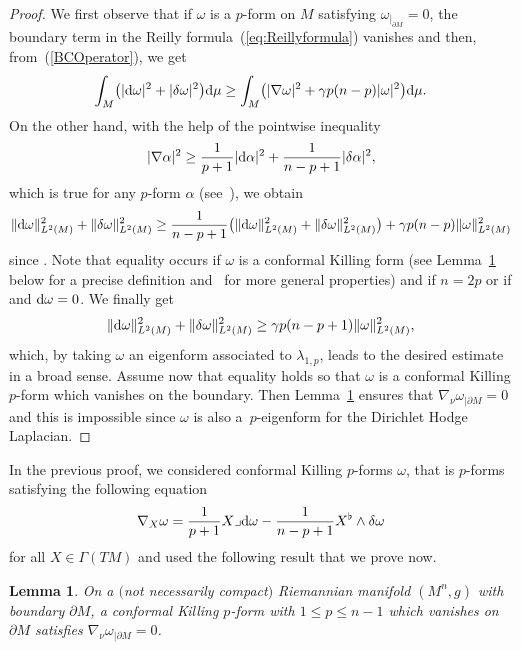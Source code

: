 \documentclass[pdftex]{sigma}
\numberwithin{equation}{section}
\newtheorem{Lemma}[Theorem]{Lemma}
\theoremstyle{definition}
\begin{document}
\begin{proof} We first observe that if $\omega$ is a $p$-form on $M$ satisfying $\omega_{|_{\partial M}}=0$, the boundary term in the Reilly formula~(\ref{eq:Reillyformula}) vanishes and then, from~(\ref{BCOperator}), we get
\[
\int_M\bigl(|{\rm d}\omega|^2+|\delta\omega|^2\bigr){\rm d}\mu\geq\int_M\bigl(|\nabla\omega|^2+\gamma p(n-p)|\omega|^2\bigr){\rm d}\mu.
\]
On the other hand, with the help of the pointwise inequality
\[
|\nabla\alpha|^2\geq\frac{1}{p+1}|{\rm d}\alpha|^2+\frac{1}{n-p+1}|\delta\alpha|^2,
\]
which is true for any $p$-form $\alpha$ (see~\cite[Lemme 6.8]{GM}), we obtain
\[
\|{\rm d}\omega \|^2_{L^2(M)}+\|\delta \omega \|^2_{L^2(M)}\ge \frac{1}{n-p+1}\bigl(\|{\rm d}\omega \|^2_{L^2(M)}+\|\delta \omega \|^2_{L^2(M)}\bigr)+\gamma p(n-p)\|\omega \|^2_{L^2(M)}
\]
since . Note that equality occurs if $\omega$ is a conformal Killing form (see Lemma~\ref{CKFB} below for a precise definition and~\cite{Semmelmann02} for more general properties) and if $n=2p$ or if  and ${\rm d}\omega=0$. We finally get
\begin{equation}\label{LaplaceBounds}
\|{\rm d}\omega\|^2_{L^2(M)}+\|\delta\omega \|^2_{L^2(M)} \geq \gamma p(n-p+1) \|\omega\|^2_{L^2(M)},
\end{equation}
which, by taking $\omega$ an eigenform associated to $\lambda_{1,p}$, leads to the desired estimate in a broad sense. Assume now that equality holds so that $\omega$ is a conformal Killing $p$-form which vanishes on the boundary. Then Lemma~\ref{CKFB} ensures that $\nabla_\nu\omega_{|\partial M}=0$ and this is impossible since $\omega$ is also a~$p$-eigenform for the Dirichlet Hodge Laplacian.
\end{proof}

In the previous proof, we considered conformal Killing $p$-forms $\omega$, that is $p$-forms satisfying the following equation
\begin{equation}\label{CKForms}
\nabla_X\omega=\frac{1}{p+1}X\lrcorner {\rm d}\omega-\frac{1}{n-p+1}X^\flat\wedge\delta\omega
\end{equation}
for all $X\in\Gamma(TM)$ and used the following result that we prove now.
\begin{Lemma}\label{CKFB}
On a $($not necessarily compact$)$ Riemannian manifold $(M^n,g)$ with boundary $\partial M$, a conformal Killing $p$-form with $1\leq p\leq n-1$ which vanishes on $\partial M$ satisfies $\nabla_\nu\omega_{|\partial M}=0$.
\end{Lemma}
\end{document}
